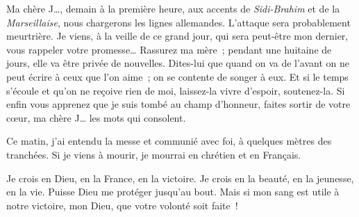 \documentclass[french,twoside]{book} %
\newenvironment{quoteblock}%
  {\begin{quoting}}
  {\end{quoting}}
\newenvironment{quotebar}{%
    \def\FrameCommand{{\color{rubric!10!}\vrule width 0.5em} \hspace{0.9em}}%
    \def\OuterFrameSep{\itemsep} %
    \MakeFramed {\advance\hsize-\width \FrameRestore}
  }%
  {%
    \endMakeFramed
  }
\renewenvironment{quoteblock}%
  {%
    \savenotes
    \setstretch{0.9}
    \normalfont
    \begin{quotebar}
  }
  {%
    \end{quotebar}
    \spewnotes
  }
\begin{document}
\begin{quoteblock}
 \noindent Ma chère J…, demain à la première heure, aux accents de {\itshape Sidi-Brahim} et de la {\itshape Marseillaise}, nous chargerons les lignes allemandes. L’attaque sera probablement meurtrière. Je viens, à la veille de ce grand jour, qui sera peut-être mon dernier, vous rappeler votre promesse… Rassurez ma mère ; pendant une huitaine de jours, elle va être privée de nouvelles. Dites-lui que quand on va de l’avant on ne peut écrire à ceux que l’on aime ; on se contente de songer à eux. Et si le temps s’écoule et qu’on ne reçoive rien de moi, laissez-la vivre d’espoir, soutenez-la. Si enfin vous apprenez que je suis tombé au champ d’honneur, faites sortir de votre cœur, ma chère J… les mots qui consolent.‌\par
 Ce matin, j’ai entendu la messe et communié avec foi, à quelques mètres des tranchées. Si je viens à mourir, je mourrai en chrétien et en Français.‌\par
 Je crois en Dieu, en la France, en la victoire. Je crois en la beauté, en la jeunesse, en la vie. Puisse Dieu me protéger jusqu’au bout. Mais si mon sang est utile à notre victoire, mon Dieu, que votre volonté soit faite !‌
 \end{quoteblock}
\end{document}
